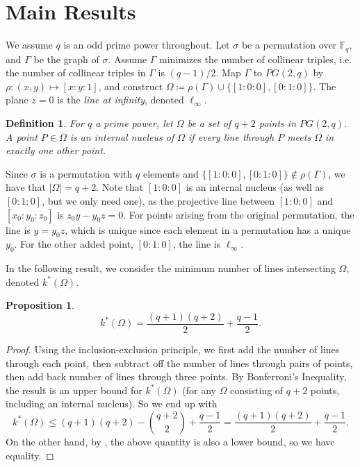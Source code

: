 \documentclass[12pt]{article}
\newcommand{\F}{\mathbb{F}}
\newtheorem{definition}{Definition}
\newtheorem{proposition}{Proposition}
\begin{document}
\section{Main Results}

We assume $q$ is an odd prime power throughout.  Let $\sigma$ be a permutation over $\F_q$, and $\Gamma$ be the graph of $\sigma$. Assume $\Gamma$ minimizes the number of collinear triples, i.e. the number of collinear triples in $\Gamma$ is $(q-1)/2$. Map $\Gamma$ to $PG(2,q)$ by $\rho : (x,y) \mapsto [x : y : 1]$, and construct $\Omega \coloneqq \rho(\Gamma) \cup \{[1:0:0],[0:1:0]\}$. The plane $z=0$ is the {\em line at infinity}, denoted $\ell_\infty$.

\begin{definition}
    For $q$ a prime power, let $\Omega$ be a set of $q+2$ points in $PG(2,q)$. A point $P \in \Omega$ is an \emph{internal nucleus} of $\Omega$ if every line through $P$ meets $\Omega$ in exactly one other point.
\end{definition}

Since $\sigma$ is a permutation with $q$ elements and $\{[1:0:0],[0:1:0]\} \notin \rho(\Gamma)$, we have that $|\Omega| = q+2$.  Note that $[1:0:0]$ is an internal nucleus (as well as $[0:1:0]$, but we only need one), as the projective line between $[1:0:0]$ and $[x_0:y_0:z_0]$ is $z_0y-y_0z=0$. For points arising from the original permutation, the line is $y=y_0z$, which is unique since each element in a permutation has a unique $y_0$. For the other added point, $[0:1:0]$, the line is $\ell_\infty$.  

In the following result, we consider the minimum number of lines intersecting $\Omega$, denoted $k^*(\Omega)$.  

\begin{proposition} \label{prop:kstar}
\begin{equation} \label{eqkstar}
k^*(\Omega) = \frac{(q+1)(q+2)}{2} + \frac{q-1}{2}.
\end{equation}
\end{proposition}

\begin{proof}

Using the inclusion-exclusion principle, we first add the number of lines through each point, then subtract off the number of lines through pairs of points, then add back number of lines through three points. By Bonferroni's Inequality, the result is an upper bound for $k^*(\Omega)$ (for any $\Omega$ consisting of $q+2$ points, including an internal nucleus). So we end up with
\[
k^*(\Omega) \leq (q+1)(q+2) - \binom{q+2}{2} + \frac{q-1}{2} = \frac{(q+1)(q+2)}{2} + \frac{q-1}{2}.
\]
On the other hand, by \cite{blokhuis}, the above quantity is also a lower bound, so we have equality.
\end{proof}
\end{document}
